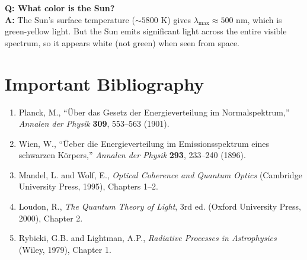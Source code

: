 \textbf{Q: What color is the Sun?}\\
\textbf{A:} The Sun's surface temperature ($\sim 5800$ K) gives $\lambda_{\max} \approx 500$ nm, which is green-yellow light. But the Sun emits significant light across the entire visible spectrum, so it appears white (not green) when seen from space.
\section*{Important Bibliography}

\begin{enumerate}
\item Planck, M., ``\"Uber das Gesetz der Energieverteilung im Normalspektrum,'' \textit{Annalen der Physik} \textbf{309}, 553--563 (1901).
\item Wien, W., ``\"Ueber die Energieverteilung im Emissionsspektrum eines schwarzen K\"orpers,'' \textit{Annalen der Physik} \textbf{293}, 233--240 (1896).
\item Mandel, L. and Wolf, E., \textit{Optical Coherence and Quantum Optics} (Cambridge University Press, 1995), Chapters 1--2.
\item Loudon, R., \textit{The Quantum Theory of Light}, 3rd ed. (Oxford University Press, 2000), Chapter 2.
\item Rybicki, G.B. and Lightman, A.P., \textit{Radiative Processes in Astrophysics} (Wiley, 1979), Chapter 1.
\end{enumerate}

